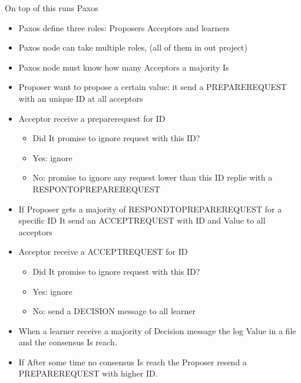 \documentclass{beamer}
\begin{document}
\begin{frame}
  \begin{center}
    \huge On top of this runs Paxos
  \end{center}
\end{frame}

\begin{frame}
  \begin{itemize}
  \item Paxos define three roles: Proposers Acceptors and learners
  \item Paxos node can take multiple roles, (all of them in out project)
  \item Paxos node must know how many Acceptors a majority Is
  \end{itemize}
\end{frame}

\begin{frame}
  \begin{itemize}
  \item Proposer want to propose a certain value: it send a PREPAREREQUEST with an unique ID at all acceptors
  \item Acceptor receive a preparerequest for ID
  \begin{itemize}
  \item Did It promise to ignore request with this ID?
  \item Yes: ignore
  \item No: promise to ignore any request lower than this ID replie with a RESPONTOPREPAREREQUEST
  \end{itemize}
  \end{itemize}
\end{frame}


\begin{frame}
  \begin{itemize}
  \item If Proposer gets a majority of RESPONDTOPREPAREREQUEST for a specific ID It send an ACCEPTREQUEST with ID and Value to all acceptors
  \item Acceptor receive a ACCEPTREQUEST for ID
  \begin{itemize}
  \item Did It promise to ignore request with this ID?
  \item Yes: ignore
  \item No: send a DECISION message to all learner
  \end{itemize}
  \item When a learner receive a majority of Decision message the log Value in a file and the consensus Is reach.
  \item If After some time no consensus Is reach the Proposer resend a PREPAREREQUEST with higher ID.
  \end{itemize}
\end{frame}
\end{document}

